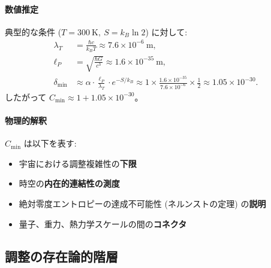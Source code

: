 \documentclass[11pt,a4paper]{article}
\begin{document}
	\paragraph{数値推定}
	典型的な条件 ($T = 300\ \mathrm{K},\ S = k_B \ln 2$) に対して:
	\begin{align*}
		\lambda_T &= \frac{\hbar c}{k_B T} \approx 7.6 \times 10^{-6}\ \mathrm{m},\\[2pt]
		\ell_P &= \sqrt{\frac{\hbar G}{c^3}} \approx 1.6 \times 10^{-35}\ \mathrm{m},\\[2pt]
		\delta_{\min} &\approx \alpha \cdot \frac{\ell_P}{\lambda_T} \cdot e^{-S/k_B}
		\approx 1 \times \frac{1.6 \times 10^{-35}}{7.6 \times 10^{-6}} \times \frac{1}{2}
		\approx 1.05 \times 10^{-30}.
	\end{align*}
	したがって $C_{\min} \approx 1 + 1.05 \times 10^{-30}$。
	
	\paragraph{物理的解釈}
	$C_{\min}$ は以下を表す:
	\begin{itemize}
		\item 宇宙における調整複雑性の\textbf{下限}
		\item 時空の\textbf{内在的連結性の測度}
		\item 絶対零度エントロピーの達成不可能性 (ネルンストの定理) の\textbf{説明}
		\item 量子、重力、熱力学スケールの間の\textbf{コネクタ}
	\end{itemize}
	
	\subsection{調整の存在論的階層}
	
\end{document}
